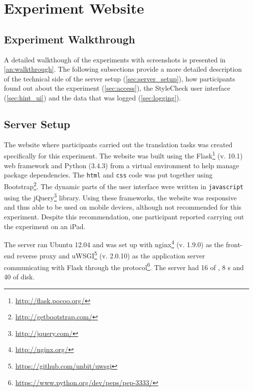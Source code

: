 
\chapter{Experiment Website} %
\label{ch:website} %

\section{Experiment Walkthrough}
\label{sec:walkthrough}

\noindent A detailed walkthough of the experiments with screenshots is presented in \autoref{an:walkthrough}. The following subsections provide a more detailed description of the technical side of the server setup (\autoref{sec:server_setup}), how participants found out about the experiment (\autoref{sec:access}), the StyleCheck user interface (\autoref{sec:hint_ui}) and the data that was logged (\autoref{sec:logging}).


\section{Server Setup}
\label{sec:server_setup}

\noindent The website where participants carried out the translation tasks was created specifically for this experiment. The website was built using the Flask\footnote{\url{http://flask.pocoo.org/}} (v. 10.1) web framework and Python (3.4.3) from a virtual environment to help manage package dependencies. The \texttt{html} and \texttt{css} code was put together using Bootstrap\footnote{\url{http://getbootstrap.com/}}. The dynamic parts of the user interface were written in \texttt{javascript} using the jQuery\footnote{\url{http://jquery.com/}} library. Using these frameworks, the website was responsive and thus able to be used on mobile devices, although not recommended for this experiment. Despite this recommendation, one participant reported carrying out the experiment on an iPad.

The server ran Ubuntu 12.04 and was set up with nginx\footnote{\url{http://nginx.org/}} (v. 1.9.0) as the front-end reverse proxy and uWSGI\footnote{\url{https://github.com/unbit/uwsgi}} (v. 2.0.10) as the application server communicating with Flask through the  protocol\footnote{\url{https://www.python.org/dev/peps/pep-3333/}}. The server had 16  of , 8 s and 40  of  disk.

